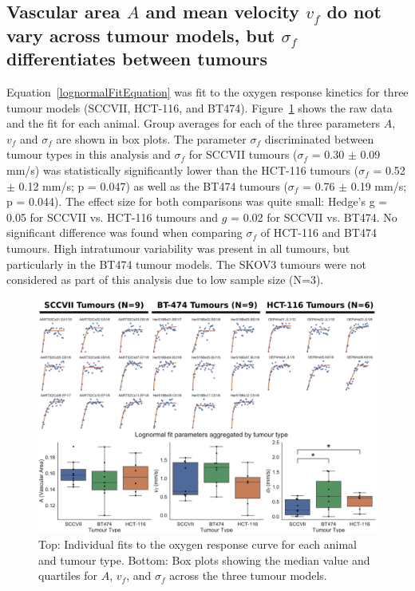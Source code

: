 \subsection{Vascular area \texorpdfstring{$A$}{A} and mean velocity \texorpdfstring{$v_f$}{vf} do not vary across tumour models, but \texorpdfstring{$\sigma_f$}{sigmaf} differentiates between tumours}
\label{sec:lognormalfitting_results}
Equation~\ref{lognormalFitEquation} was fit to the oxygen response kinetics for three tumour models (SCCVII, HCT-116, and BT474).
Figure~\ref{fig:lognormal_CHB} shows the raw data and the fit for each animal. 
Group averages for each of the three parameters $A$, $v_f$ and $\sigma_f$ are shown in box plots.
The parameter $\sigma_f$ discriminated between tumour types in this analysis and $\sigma_f$ for SCCVII tumours ($\sigma_f$ = 0.30 $\pm$ 0.09 mm/s) was statistically significantly lower than the HCT-116 tumours ($\sigma_f$ = 0.52 $\pm$ 0.12 mm/s; p = 0.047) as well as the BT474 tumours ($\sigma_f$ = 0.76 $\pm$ 0.19 mm/s; p = 0.044).
The effect size for both comparisons was quite small: Hedge's g = 0.05 for SCCVII vs. HCT-116 tumours and $g$ = 0.02 for SCCVII vs. BT474. 
No significant difference was found when comparing $\sigma_f$ of HCT-116 and BT474 tumours.
High intratumour variability was present in all tumours, but particularly in the BT474 tumour models.
The SKOV3 tumours were not considered as part of this analysis due to low sample size (N=3). 

\begin{figure}[htbp]
   \centering
   \includegraphics[width=\textwidth]{oemri_thesis2/oemri_thesis2-images/lognormalFittingAgg_CHB.png} %
   \caption{Top: Individual fits to the oxygen response curve for each animal and tumour type.
   Bottom: Box plots showing the median value and quartiles for $A$, $v_f$, and $\sigma_f$ across the three tumour models.}
   \label{fig:lognormal_CHB}
\end{figure}


